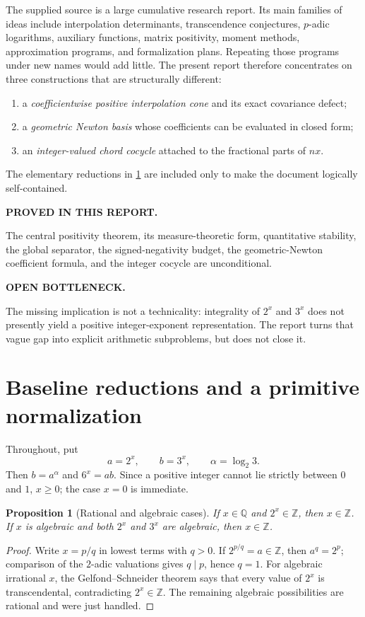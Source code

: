 \documentclass[11pt]{article}
\newtheorem{proposition}[theorem]{Proposition}
\theoremstyle{definition}
\newcommand{\Z}{\mathbb Z}
\newcommand{\Q}{\mathbb Q}
\newcommand{\status}[2]{\par\medskip\noindent\colorbox{#1!10}{\parbox{0.965\linewidth}{\textbf{#2}}}\par\medskip}
\newcommand{\proved}{\status{deepgreen}{PROVED IN THIS REPORT. }}
\newcommand{\openstatus}{\status{deepred}{OPEN BOTTLENECK. }}
\begin{document}
The supplied source is a large cumulative research report.  Its main families of ideas include interpolation determinants, transcendence conjectures, $p$-adic logarithms, auxiliary functions, matrix positivity, moment methods, approximation programs, and formalization plans.  Repeating those programs under new names would add little.  The present report therefore concentrates on three constructions that are structurally different:
\begin{enumerate}[label=(\roman*)]
\item a \emph{coefficientwise positive interpolation cone} and its exact covariance defect;
\item a \emph{geometric Newton basis} whose coefficients can be evaluated in closed form;
\item an \emph{integer-valued chord cocycle} attached to the fractional parts of $nx$.
\end{enumerate}
The elementary reductions in \cref{sec:reductions} are included only to make the document logically self-contained.

\proved The central positivity theorem, its measure-theoretic form, quantitative stability, the global separator, the signed-negativity budget, the geometric-Newton coefficient formula, and the integer cocycle are unconditional.

\openstatus The missing implication is not a technicality: integrality of $2^x$ and $3^x$ does not presently yield a positive integer-exponent representation.  The report turns that vague gap into explicit arithmetic subproblems, but does not close it.

\section{Baseline reductions and a primitive normalization}\label{sec:reductions}

Throughout, put
\[
 a=2^x,\qquad b=3^x,\qquad \alpha=\log_2 3.
\]
Then $b=a^\alpha$ and $6^x=ab$.  Since a positive integer cannot lie strictly between $0$ and $1$, $x\ge 0$; the case $x=0$ is immediate.

\begin{proposition}[Rational and algebraic cases]\label{prop:basic-cases}
If $x\in\Q$ and $2^x\in\Z$, then $x\in\Z$.  If $x$ is algebraic and both $2^x$ and $3^x$ are algebraic, then $x\in\Z$.
\end{proposition}
\begin{proof}
Write $x=p/q$ in lowest terms with $q>0$.  If $2^{p/q}=a\in\Z$, then $a^q=2^p$; comparison of the $2$-adic valuations gives $q\mid p$, hence $q=1$.  For algebraic irrational $x$, the Gelfond--Schneider theorem says that every value of $2^x$ is transcendental, contradicting $2^x\in\Z$.  The remaining algebraic possibilities are rational and were just handled.
\end{proof}
\end{document}
